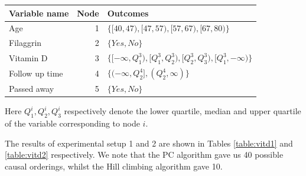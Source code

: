\documentclass{tufte-book}
\begin{document}
\begin{center}
\begin{tabular}{l|r|l}
\hline
Variable name & Node & Outcomes\\
\hline
Age & 1 & \(\{[40,47),[47,57),[57,67),[67,80)\}\)\\
Filaggrin & 2 & \(\{Yes,No\}\)\\
Vitamin D & 3 & \(\{ [-\infty,Q^3_1),[Q^3_1,Q^3_2),[Q^3_2,Q^3_3),[Q^3_1,-\infty) \}\)\\
Follow up time & 4 & \(\{(-\infty, Q^4_2],(Q^4_2, \infty) \}\)\\
Passed away & 5 & \(\{Yes,No \}\)\\
\end{tabular}
\end{center}

Here \(Q^i_1,Q^i_2,Q^i_3\) respectively denote the lower quartile, median and upper quartile of the variable corresponding to node \(i\).

The results of experimental setup 1 and 2 are shown in Tables \ref{table:vitd1} and \ref{table:vitd2} respectively. We note that the PC algorithm gave us 40 possible causal orderings, whilst the Hill climbing algorithm gave 10.
\end{document}
